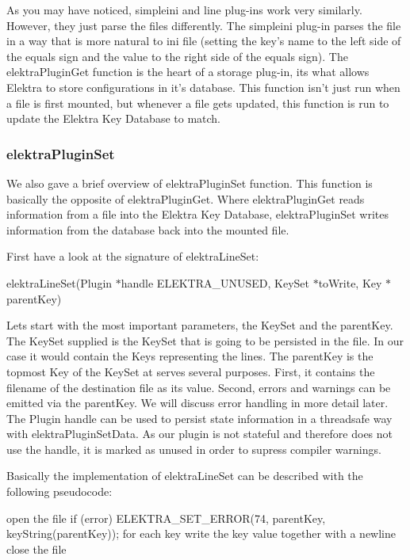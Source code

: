 As you may have noticed, simpleini and line plug-\/ins work very similarly. However, they just parse the files differently. The simpleini plug-\/in parses the file in a way that is more natural to ini file (setting the key's name to the left side of the equals sign and the value to the right side of the equals sign). The {\ttfamily elektra\+Plugin\+Get} function is the heart of a storage plug-\/in, its what allows Elektra to store configurations in it's database. This function isn't just run when a file is first mounted, but whenever a file gets updated, this function is run to update the Elektra Key Database to match.

\subsubsection*{elektra\+Plugin\+Set}

We also gave a brief overview of {\ttfamily elektra\+Plugin\+Set} function. This function is basically the opposite of {\ttfamily elektra\+Plugin\+Get}. Where {\ttfamily elektra\+Plugin\+Get} reads information from a file into the Elektra Key Database, {\ttfamily elektra\+Plugin\+Set} writes information from the database back into the mounted file.

First have a look at the signature of {\ttfamily elektra\+Line\+Set}\+:

{\ttfamily elektra\+Line\+Set(\+Plugin $\ast$handle E\+L\+E\+K\+T\+R\+A\+\_\+\+U\+N\+U\+S\+E\+D, Key\+Set $\ast$to\+Write, Key $\ast$parent\+Key)}

Lets start with the most important parameters, the Key\+Set and the {\ttfamily parent\+Key}. The Key\+Set supplied is the Key\+Set that is going to be persisted in the file. In our case it would contain the Keys representing the lines. The {\ttfamily parent\+Key} is the topmost Key of the Key\+Set at serves several purposes. First, it contains the filename of the destination file as its value. Second, errors and warnings can be emitted via the parent\+Key. We will discuss error handling in more detail later. The Plugin handle can be used to persist state information in a threadsafe way with {\ttfamily elektra\+Plugin\+Set\+Data}. As our plugin is not stateful and therefore does not use the handle, it is marked as unused in order to supress compiler warnings.

Basically the implementation of {\ttfamily elektra\+Line\+Set} can be described with the following pseudocode\+: \begin{DoxyVerb}    open the file
    if (error)
    {
            ELEKTRA_SET_ERROR(74, parentKey, keyString(parentKey));
    }
    for each key
    {
            write the key value together with a newline
    }
    close the file
\end{DoxyVerb}


